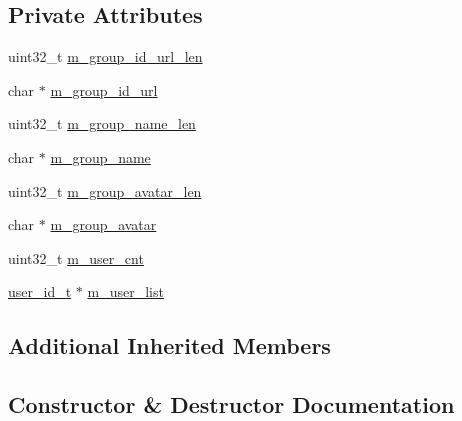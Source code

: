\subsection*{Private Attributes}
\begin{DoxyCompactItemize}
\item 
uint32\+\_\+t \hyperlink{class_c_im_pdu_client_group_create_normal_group_notify_a153373cb75f32b6642ed3c7b2b613282}{m\+\_\+group\+\_\+id\+\_\+url\+\_\+len}
\item 
char $\ast$ \hyperlink{class_c_im_pdu_client_group_create_normal_group_notify_a4bd66adf14c322b3e4128557feee788b}{m\+\_\+group\+\_\+id\+\_\+url}
\item 
uint32\+\_\+t \hyperlink{class_c_im_pdu_client_group_create_normal_group_notify_ab7b2b8898b13ea3e173e95b92bbc71fd}{m\+\_\+group\+\_\+name\+\_\+len}
\item 
char $\ast$ \hyperlink{class_c_im_pdu_client_group_create_normal_group_notify_aa9850a0fc23abb23b055559349a18f8d}{m\+\_\+group\+\_\+name}
\item 
uint32\+\_\+t \hyperlink{class_c_im_pdu_client_group_create_normal_group_notify_a32d1f54086e43f4eb79c90e030039d20}{m\+\_\+group\+\_\+avatar\+\_\+len}
\item 
char $\ast$ \hyperlink{class_c_im_pdu_client_group_create_normal_group_notify_a1096cfb38dd3649eb3dc5b792277a1e0}{m\+\_\+group\+\_\+avatar}
\item 
uint32\+\_\+t \hyperlink{class_c_im_pdu_client_group_create_normal_group_notify_a11bf0d82ce7dcb3e0aea4e635c60bda0}{m\+\_\+user\+\_\+cnt}
\item 
\hyperlink{structuser__id__t}{user\+\_\+id\+\_\+t} $\ast$ \hyperlink{class_c_im_pdu_client_group_create_normal_group_notify_ad03dfd85e896e6b96261f3b22a784297}{m\+\_\+user\+\_\+list}
\end{DoxyCompactItemize}
\subsection*{Additional Inherited Members}


\subsection{Constructor \& Destructor Documentation}
\hypertarget{class_c_im_pdu_client_group_create_normal_group_notify_aff5a27b2d1f944df5f4bae3ba5054df1}{}
